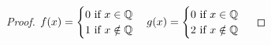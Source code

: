 \documentclass[12pt,letterpaper]{article}
\begin{document}
\begin{itemize}[leftmargin=!,labelindent=5pt]
\begin{itemize}
\begin{proof}
                        \(
                            f(x) = 
                            \begin{cases}
                                0 \text{ if } x \in \mathbb{Q} \\
                                1 \text{ if } x \notin \mathbb{Q}
                            \end{cases}
                            \\
                            g(x) = 
                            \begin{cases}
                                0 \text{ if } x \in \mathbb{Q} \\
                                2 \text{ if } x \notin \mathbb{Q}
                            \end{cases}
                        \)


\end{proof}
\end{itemize}
\end{itemize}
\end{document}
